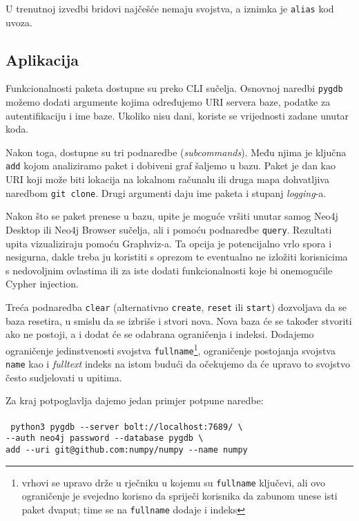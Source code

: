 U trenutnoj izvedbi bridovi najčešće nemaju svojstva, a iznimka je \texttt{alias} kod uvoza.

\newpage
\subsection{Aplikacija}
Funkcionalnosti paketa dostupne su preko CLI sučelja. Osnovnoj naredbi \texttt{pygdb}
možemo dodati argumente kojima određujemo URI servera baze, podatke za autentifikaciju
i ime baze. Ukoliko nisu dani, koriste se vrijednosti zadane unutar koda. 

Nakon toga, dostupne su tri podnaredbe (\textsl{subcommands}). Među njima je ključna
\texttt{add} kojom analiziramo paket i dobiveni graf šaljemo u bazu. Paket je
dan kao URI koji može biti lokacija na lokalnom računalu ili druga mapa 
dohvatljiva naredbom \texttt{git\- clone}. Drugi argumenti daju 
ime paketa i stupanj \emph{logging}-a.

Nakon što se paket prenese u bazu, upite je moguće vršiti unutar
samog Neo4j Desktop ili Neo4j Browser sučelja, ali i pomoću podnaredbe
\texttt{query}. Rezultati upita vizualiziraju pomoću Graphviz-a. Ta opcija
je potencijalno vrlo spora i nesigurna, dakle treba ju koristiti s oprezom
te eventualno ne izložiti korisnicima s nedovoljnim ovlastima ili za 
iste dodati funkcionalnosti koje bi onemogućile Cypher injection.

Treća podnaredba \texttt{clear} (alternativno \texttt{create}, \texttt{reset} ili \texttt{start})
dozvoljava da se baza resetira, u smislu da se izbriše i stvori nova. Nova baza će se također stvoriti
ako ne postoji, a i dodat će se odabrana ograničenja i indeksi. Dodajemo ograničenje jedinstvenosti svojstva
\texttt{fullname}\footnote{vrhovi se upravo drže u rječniku u kojemu su \texttt{fullname} ključevi,
ali ovo ograničenje je svejedno korisno da spriječi korisnika da zabunom
unese isti paket dvaput; time se na \texttt{fullname} dodaje i indeks}, ograničenje
postojanja svojstva \texttt{name} kao i \emph{fulltext} indeks na istom
budući da očekujemo da će upravo to svojstvo često sudjelovati u upitima.

Za kraj potpoglavlja dajemo jedan primjer potpune naredbe: \\ \\
\texttt{
	python3 pygdb -{}-server bolt:\slash\slash localhost:7689\slash\ \textbackslash \\
	-{}-auth neo4j password -{}-database pygdb \textbackslash \\
	add -{}-uri git@github.com:numpy\slash numpy -{}-name numpy}


